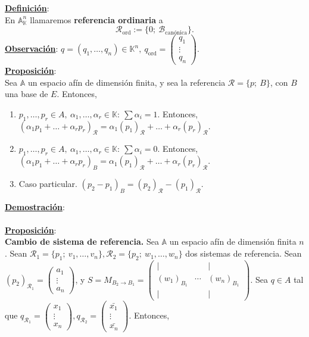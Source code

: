 \documentclass[11pt]{article}
\newcommand{\af}{\mathbb{A}}
\newcommand{\defi}{\underline{\textbf{Definición}}:\\}
\newcommand{\prop}{\underline{\textbf{Proposición}}:\\}
\newcommand{\dem}{\underline{\textbf{Demostración}}:\\}
\newcommand{\obs}{\underline{\textbf{Observación}}: }
\begin{document}
\defi En $\af^n_{\mathbb{K}}$ llamaremos \textbf{referencia ordinaria} a
$$
\mathcal{R}_{\textrm{ord}}:=\{0;\ \mathcal{B}_{\textrm{canónica}}\}.
$$
\obs $q=(q_1,\ldots,q_n)\in\mathbb{K}^n,\ q_{\textrm{ord}}=\begin{pmatrix}
q_1\\
\vdots\\
q_n
\end{pmatrix}.$\\
\prop Sea $\af$ un espacio afín de dimensión finita, y sea la referencia $\mathcal{R}=\{p;\ B\}$, con $B$ una base de $E$. Entonces,
\begin{enumerate}
	\item $p_1,\ldots,p_r\in A,\ \alpha_1,\ldots,\alpha_r\in\mathbb{K}:\ \sum\alpha_i=1.$ Entonces, 
	$(\alpha_1p_1+\ldots+\alpha_rp_r)_{\mathcal{R}}=\alpha_1(p_1)_{\mathcal{R}}+\ldots+\alpha_r(p_r)_{\mathcal{R}}.$
	\item $p_1,\ldots,p_r\in A,\ \alpha_1,\ldots,\alpha_r\in\mathbb{K}:\ \sum\alpha_i=0.$ Entonces, 
	$(\alpha_1p_1+\ldots+\alpha_rp_r)_B=\alpha_1(p_1)_{\mathcal{R}}+\ldots+\alpha_r(p_r)_{\mathcal{R}}.$
	\item Caso particular. $(p_2-p_1)_B=(p_2)_{\mathcal{R}}-(p_1)_{\mathcal{R}}.$
\end{enumerate}
\dem \\
\prop \textbf{Cambio de sistema de referencia.} Sea $\af$ un espacio afín de dimensión finita $n$. Sean $\mathcal{R}_1=\{p_1;\ v_1,\ldots,v_n\},\mathcal{R}_2=\{p_2;\ w_1,\ldots,w_n\}$ dos sistemas de referencia. Sean $(p_2)_{\mathcal{R}_1}=\begin{pmatrix}
a_1\\
\vdots\\
a_n
\end{pmatrix}$, y $S=M_{B_2\rightarrow B_1}=\begin{pmatrix}
\vert &  & \vert\\
(w_1)_{B_1} & \cdots & (w_n)_{B_1}\\
\vert &  & \vert
\end{pmatrix}$. Sea $q\in A$ tal que $q_{\mathcal{R}_1}=\begin{pmatrix}
x_1\\
\vdots\\
x_n
\end{pmatrix},q_{\mathcal{R}_2}=\begin{pmatrix}
\bar{x_1}\\
\vdots\\
\bar{x_n}
\end{pmatrix}$. Entonces,
\end{document}
